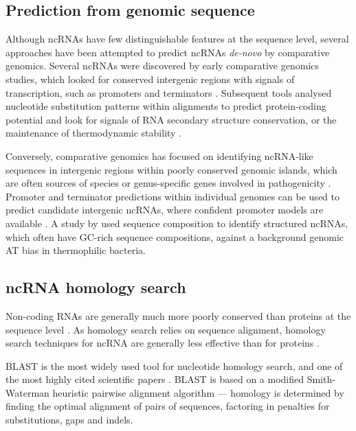 \subsection{Prediction from genomic sequence}
Although ncRNAs have few distinguishable features at the sequence level, several approaches have been attempted to predict ncRNAs \textit{de-novo} by comparative genomics. Several ncRNAs were discovered by early comparative genomics studies, which looked for conserved intergenic regions with signals of transcription, such as promoters and terminators \citep{Argaman2001-oc,Wassarman2001-ht}. Subsequent tools analysed nucleotide substitution patterns within alignments to predict protein-coding potential and look for signals of RNA secondary structure conservation, or the maintenance of thermodynamic stability \citep{Gruber_2010,Pedersen_2006,Rivas2001-lk}.

Conversely, comparative genomics has focused on identifying ncRNA-like sequences in intergenic regions within poorly conserved genomic islands, which are often sources of species or genus-specific genes involved in pathogenicity \citep{Padalon-Brauch2008-bp}. Promoter and terminator predictions within individual genomes can be used to predict candidate intergenic ncRNAs, where confident promoter models are available \citep{Sridhar_2010,Herbig_Nieselt_2011}. A study by \cite{Klein2002-fm} used sequence composition to identify structured ncRNAs, which often have GC-rich sequence compositions, against a background genomic AT bias in thermophilic bacteria.

\subsection{ncRNA homology search}

Non-coding RNAs are generally much more poorly conserved than proteins at the sequence level \citep{Lindgreen2014-dk}. As homology search relies on sequence alignment, homology search techniques for ncRNA are generally less effective than for proteins \citep{Sun2012-ef,Rivas2001-lk,McGimpsey2019-ys}.

BLAST is the most widely used tool for nucleotide homology search, and one of the most highly cited scientific papers \citep{Altschul1990-kr}. BLAST is based on a modified Smith-Waterman heuristic pairwise alignment algorithm --- homology is determined by finding the optimal alignment of pairs of sequences, factoring in penalties for substitutions, gaps and indels.


